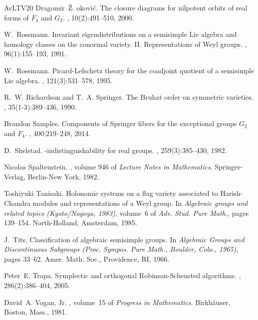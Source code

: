 \documentclass[a4paper, 11pt]{article}
\begin{document}
\begin{thebibliography}{AvLTV20}
Dragomir~\v{Z}. {\DJ}okovi\'c.
\newblock The closure diagrams for nilpotent orbits of real forms of {$F_4$}
  and {$G_2$}.
, 10(2):491--510, 2000.

W.~Rossmann.
\newblock Invariant eigendistributions on a semisimple {L}ie algebra and
  homology classes on the conormal variety. {II}. {R}epresentations of {W}eyl
  groups.
, 96(1):155--193, 1991.

W.~Rossmann.
\newblock Picard-{L}efschetz theory for the coadjoint quotient of a semisimple
  {L}ie algebra.
, 121(3):531--578, 1995.

R.~W. Richardson and T.~A. Springer.
\newblock The {B}ruhat order on symmetric varieties.
, 35(1-3):389--436, 1990.

Brandon Samples.
\newblock Components of {S}pringer fibers for the exceptional groups {$G_2$}
  and {$F_4$}.
, 400:219--248, 2014.

D.~Shelstad.
-indistinguishability for real groups.
, 259(3):385--430, 1982.

Nicolas Spaltenstein.
, volume 946 of
  {\em Lecture Notes in Mathematics}.
\newblock Springer-Verlag, Berlin-New York, 1982.

Toshiyuki Tanisaki.
\newblock Holonomic systems on a flag variety associated to {H}arish-{C}handra
  modules and representations of a {W}eyl group.
\newblock In {\em Algebraic groups and related topics ({K}yoto/{N}agoya,
  1983)}, volume~6 of {\em Adv. Stud. Pure Math.}, pages 139--154.
  North-Holland, Amsterdam, 1985.

J.~Tits.
\newblock Classification of algebraic semisimple groups.
\newblock In {\em Algebraic {G}roups and {D}iscontinuous {S}ubgroups ({P}roc.
  {S}ympos. {P}ure {M}ath., {B}oulder, {C}olo., 1965)}, pages 33--62. Amer.
  Math. Soc., Providence, RI, 1966.

Peter~E. Trapa.
\newblock Symplectic and orthogonal {R}obinson-{S}chensted algorithms.
, 286(2):386--404, 2005.

David~A. Vogan, Jr.
, volume~15 of
  {\em Progress in Mathematics}.
\newblock Birkh\"{a}user, Boston, Mass., 1981.


\end{thebibliography}
\end{document}
